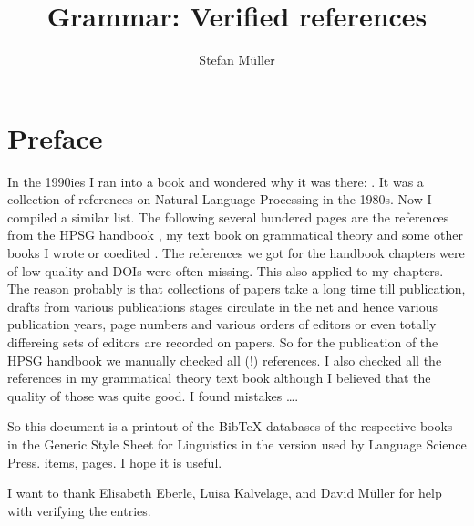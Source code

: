 \documentclass{scrbook}
\title{Grammar: Verified references}
\author{Stefan Müller}
\begin{document}
\maketitle

\chapter*{Preface}

In the 1990ies I ran into a book and wondered why it was there: . It was a
collection of references on Natural Language Processing in the 1980s. Now I compiled a similar
list. The following several hundered pages are the references from the HPSG handbook
\citep{HPSGHandbook}, my text book on grammatical theory \citep{MuellerGT-Eng} and some other books
I wrote or coedited \citep*{MuellerGermanic,MOeDanish,FSM2022a-ed}. The
references we got for the handbook chapters were of low quality and DOIs were often missing. This
also applied to my chapters. The reason probably is that collections of papers take a long time till
publication, drafts from various publications stages circulate in the net and hence various
publication years, page numbers and various orders of editors or even totally differeing sets of
editors are recorded on papers. So for the publication of the HPSG handbook we manually checked all
(!) references. I also checked all the references in my grammatical theory text book although I
believed that the quality of those was quite good. I found mistakes \ldots.

So this document is a printout of the BibTeX databases of the respective books in the Generic Style
Sheet for Linguistics in the version used by Language Science Press. 
 items, \pageref{lastpage} pages.
I hope it is useful.

I want to thank Elisabeth Eberle, Luisa Kalvelage, and David Müller for help with verifying the
 entries.

\mainmatter


\nocite{*}

\printbibliography

\label{lastpage}
\end{document}
